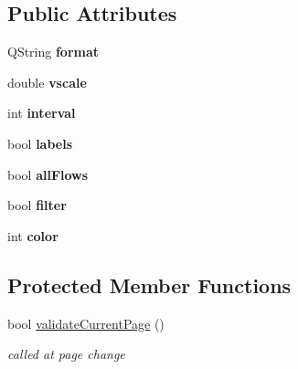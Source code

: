\subsection*{Public Attributes}
\begin{DoxyCompactItemize}
\item 
\hypertarget{class_export_wizard_af945c96c63098d827dd5eb684b568358}{}Q\+String {\bfseries format}\label{class_export_wizard_af945c96c63098d827dd5eb684b568358}

\item 
\hypertarget{class_export_wizard_a7d7df4c19102b7c04338cb5d7a169599}{}double {\bfseries vscale}\label{class_export_wizard_a7d7df4c19102b7c04338cb5d7a169599}

\item 
\hypertarget{class_export_wizard_a27bce3b2f0766e050c4da038d22453fd}{}int {\bfseries interval}\label{class_export_wizard_a27bce3b2f0766e050c4da038d22453fd}

\item 
\hypertarget{class_export_wizard_a02b2440bcb42d057cd8f327c9b985150}{}bool {\bfseries labels}\label{class_export_wizard_a02b2440bcb42d057cd8f327c9b985150}

\item 
\hypertarget{class_export_wizard_a74b5b1abb7991fab3663727dcad071b8}{}bool {\bfseries all\+Flows}\label{class_export_wizard_a74b5b1abb7991fab3663727dcad071b8}

\item 
\hypertarget{class_export_wizard_ac47c67db06c0d02cfaeab02c3629cd11}{}bool {\bfseries filter}\label{class_export_wizard_ac47c67db06c0d02cfaeab02c3629cd11}

\item 
\hypertarget{class_export_wizard_aa8d2e7cf93e56da19110cd6473fc7f5f}{}int {\bfseries color}\label{class_export_wizard_aa8d2e7cf93e56da19110cd6473fc7f5f}

\end{DoxyCompactItemize}
\subsection*{Protected Member Functions}
\begin{DoxyCompactItemize}
\item 
\hypertarget{class_export_wizard_a54cbfa3581936f77e15a65a0f328db15}{}bool \hyperlink{class_export_wizard_a54cbfa3581936f77e15a65a0f328db15}{validate\+Current\+Page} ()\label{class_export_wizard_a54cbfa3581936f77e15a65a0f328db15}

\begin{DoxyCompactList}\small\item\em called at page change \end{DoxyCompactList}\end{DoxyCompactItemize}
